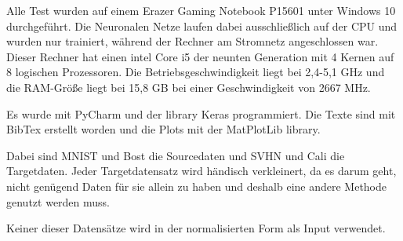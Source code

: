 Alle Test wurden auf einem Erazer Gaming Notebook P15601 unter Windows 10 durchgeführt.
Die Neuronalen Netze laufen dabei ausschließlich auf 
der CPU und wurden nur trainiert, während der Rechner am Stromnetz angeschlossen war. 
Dieser Rechner hat einen intel Core i5 der neunten Generation mit 4 Kernen auf 8 
logischen Prozessoren. Die Betriebsgeschwindigkeit liegt bei 2,4-5,1 GHz und die 
RAM-Größe liegt bei 15,8 GB bei einer Geschwindigkeit von 2667 MHz. 

Es wurde mit PyCharm und der library Keras programmiert. Die Texte sind mit BibTex 
erstellt worden und die Plots mit der MatPlotLib library.

Dabei sind MNIST und Bost die Sourcedaten und SVHN und Cali die Targetdaten. Jeder Targetdatensatz 
wird händisch verkleinert, da es darum geht, nicht genügend Daten für sie allein zu haben und deshalb eine andere 
Methode genutzt werden muss.

Keiner dieser Datensätze wird in der normalisierten Form als Input verwendet. 
